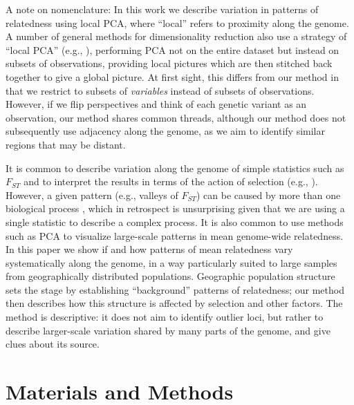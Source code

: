 \documentclass[11pt, oneside]{article}   	%
\newcommand\citet{\cite}
\newcommand\citep{\cite}
\renewcommand{\revpoint}[2]{\relax}
\renewcommand{\llabel}[1]{\relax}
\begin{document}
A note on nomenclature: In this work we describe variation in patterns of relatedness using local PCA,
where ``local'' refers to proximity along the genome.
A number of general methods for dimensionality reduction also use a strategy of ``local PCA''
(e.g., \citet{manjon2013diffusion,kambhatla1997dimension,weingessel2000local,roweis2000nonlinear}),
performing PCA not on the entire dataset but instead on subsets of observations,
providing local pictures which are then stitched back together to give a global picture.
At first sight,
this differs from our method in that we restrict to subsets of \emph{variables} instead of subsets of observations.
However, if we flip perspectives and think of each genetic variant as an observation,
our method shares common threads, although 
our method does not subsequently use adjacency along the genome,
as we aim to identify similar regions that may be distant.

It is common to describe variation along the genome of simple statistics such as $F_{ST}$
and to interpret the results in terms of the action of selection 
(e.g., \citet{turner2005genomic,ellegren2012genomic}).
However, a given pattern (e.g., valleys of $F_{ST}$)
can be caused by more than one biological process \citep{cruickshank2014reanalysis,burri2015linked},
which in retrospect is unsurprising given that we are using a single statistic
to describe a complex process.
It is also common to use methods such as PCA to visualize large-scale patterns in 
mean genome-wide relatedness.
In this paper we show if and how patterns of mean relatedness vary systematically along the genome, 
in a way particularly suited to large samples from geographically distributed populations.
Geographic population structure sets the stage by establishing ``background'' patterns of relatedness;
our method then describes how this structure is affected by selection and other factors.
The method is descriptive:
it does not aim to identify outlier loci,
but rather to describe larger-scale variation shared by many parts of the genome,
and give clues about its source. \llabel{ll:descriptive}



\section{Materials and Methods}
\end{document}
